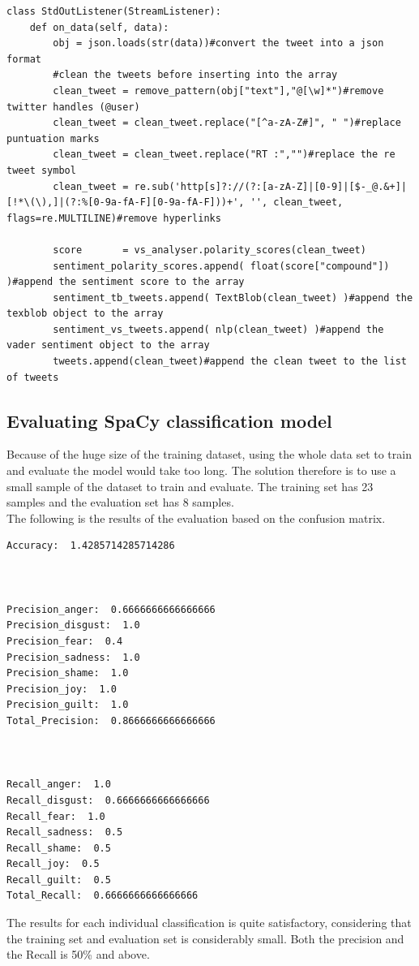 \begin{lstlisting}
class StdOutListener(StreamListener):
    def on_data(self, data):
        obj = json.loads(str(data))#convert the tweet into a json format
        #clean the tweets before inserting into the array
        clean_tweet = remove_pattern(obj["text"],"@[\w]*")#remove twitter handles (@user)
        clean_tweet = clean_tweet.replace("[^a-zA-Z#]", " ")#replace puntuation marks
        clean_tweet = clean_tweet.replace("RT :","")#replace the re tweet symbol
        clean_tweet = re.sub('http[s]?://(?:[a-zA-Z]|[0-9]|[$-_@.&+]|[!*\(\),]|(?:%[0-9a-fA-F][0-9a-fA-F]))+', '', clean_tweet, flags=re.MULTILINE)#remove hyperlinks
        
        score       = vs_analyser.polarity_scores(clean_tweet)
        sentiment_polarity_scores.append( float(score["compound"]) )#append the sentiment score to the array
        sentiment_tb_tweets.append( TextBlob(clean_tweet) )#append the texblob object to the array
        sentiment_vs_tweets.append( nlp(clean_tweet) )#append the vader sentiment object to the array
        tweets.append(clean_tweet)#append the clean tweet to the list of tweets
\end{lstlisting}



\subsection{Evaluating SpaCy classification model}\label{sec:THEORY:linear}
Because of the huge size of the training dataset, using the whole data set to train and evaluate the model would take too long. The solution therefore is to use a small sample of the dataset to train and evaluate.
The training set has 23 samples and the evaluation set has 8 samples.\\
The following is the results of the evaluation based on the confusion matrix.

\begin{lstlisting}
Accuracy:  1.4285714285714286



Precision_anger:  0.6666666666666666
Precision_disgust:  1.0
Precision_fear:  0.4
Precision_sadness:  1.0
Precision_shame:  1.0
Precision_joy:  1.0
Precision_guilt:  1.0
Total_Precision:  0.8666666666666666



Recall_anger:  1.0
Recall_disgust:  0.6666666666666666
Recall_fear:  1.0
Recall_sadness:  0.5
Recall_shame:  0.5
Recall_joy:  0.5
Recall_guilt:  0.5
Total_Recall:  0.6666666666666666
\end{lstlisting}

The results for each individual classification is quite satisfactory, considering that the training set and evaluation set is considerably small. Both the precision and the Recall is 50\% and above.




